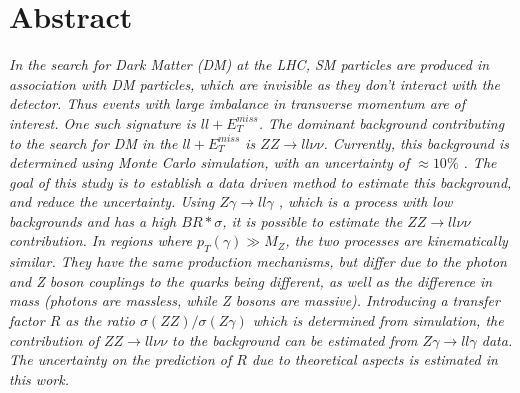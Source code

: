 \documentclass[11pt,a4paper,final]{report}
\newcommand{\ZZ}{$ZZ\to ll\nu\nu$ }
\newcommand{\Zgam}{$Z\gamma\to ll\gamma$ }
\begin{document}
\section*{Abstract}
\textit{
In the search for Dark Matter (DM) at the LHC, SM particles are produced in association with DM particles, which are invisible as they don't interact with the detector. Thus events with large imbalance in transverse momentum are of interest. One such signature is $ll + E_T^{miss}$. The dominant background contributing to the search for DM in the $ll + E_T^{miss}$ is $ZZ \rightarrow ll\nu\nu$.  Currently, this background is determined using Monte Carlo simulation, with an uncertainty of $\approx 10\%$ \cite{ZH_ATLAS}. The goal of this study is to establish a data driven method to estimate this background, and reduce the uncertainty. Using \Zgam, which is a process with low backgrounds and has a high $BR*\sigma$, it is possible to estimate the \ZZ contribution. In regions where $p_{T}(\gamma) \gg M_{Z}$, the two processes are kinematically similar. They have the same production mechanisms, but differ due to the photon and Z boson couplings to the quarks being different, as well as the difference in mass (photons are massless, while Z bosons are massive). Introducing a transfer factor $R$ as the ratio $\sigma(ZZ)/\sigma(Z\gamma)$ which is determined from simulation, the contribution of \ZZ to the background can be estimated from \Zgam data. The uncertainty on the prediction of $R$ due to theoretical aspects is estimated in this work.
}
\end{document}
